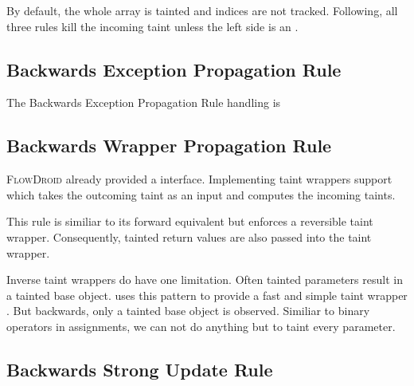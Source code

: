 \documentclass[../draft.tex]{subfiles}
\begin{document}
    By default, the whole array is tainted and indices are not tracked. Following, all three rules kill the incoming taint unless the left side is an . 

    \subsection{Backwards Exception Propagation Rule}
    The Backwards Exception Propagation Rule handling is

    \subsection{Backwards Wrapper Propagation Rule}
    \textsc{FlowDroid} already provided a  interface. Implementing taint wrappers support  which takes the outcoming taint as an input and computes the incoming taints.

    This rule is similiar to its forward equivalent but enforces a reversible taint wrapper. Consequently, tainted return values are also passed into the taint wrapper.

    Inverse taint wrappers do have one limitation. Often tainted parameters result in a tainted base object.  uses this pattern to provide a fast and simple taint wrapper \cite{Arzt2017PhD}. But backwards, only a tainted base object is observed. Similiar to binary operators in assignments, we can not do anything but to taint every parameter.


    \subsection{Backwards Strong Update Rule}
\end{document}
